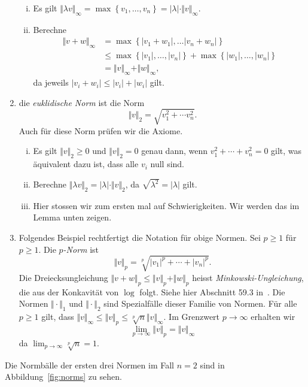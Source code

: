 \documentclass[../main.tex]{subfiles}
\begin{document}
\begin{examples}
\begin{enumerate}[(1)]
\begin{enumerate}[(i)]
        \item Es gilt $\Vert \lambda v \Vert_{\infty}
          = \max \left\{v_1, \dots, v_n\right\} = |\lambda|
          \cdot \Vert v \Vert_\infty$.
        \item Berechne
          \begin{align*}
            \Vert v + w \Vert_\infty
            &= \max \left\{|v_1 + w_1|, \dots |v_n + w_n|\right\} \\
            &\leq \max \left\{|v_{1}|, \dots, |v_{n}|\right\}
            + \max \left\{|w_{1}|, \dots, |w_{n}|\right\} \\
            &= \Vert v \Vert_{\infty} + \Vert w \Vert_{\infty},
          \end{align*}
          da jeweils $|v_i + w_i| \leq |v_i| + |w_i| $ gilt.
      \end{enumerate}
    \item die \emph{euklidische Norm} ist die Norm
      \[
        \Vert v \Vert_2 = \sqrt{v_1^2 + \cdots v_n^2}.
      \]
      Auch für diese Norm prüfen wir die Axiome.
      \begin{enumerate}[(i)]
        \item Es gilt $\Vert v \Vert_2 \geq 0$ und
          $\Vert v \Vert_2 = 0$ genau dann, wenn
          $v_1^2 + \cdots + v_n^2 = 0$ gilt,
          was äquivalent dazu ist, dass alle $v_i$ null sind.
        \item Berechne $\Vert \lambda v \Vert_2 = |\lambda | \cdot
          \Vert v \Vert_2$, da $\sqrt{\lambda^2} = |\lambda|$ gilt.
        \item Hier stossen wir zum ersten mal auf Schwierigkeiten.
          Wir werden das im Lemma unten zeigen.
      \end{enumerate}
    \item 
      Folgendes Beispiel rechtfertigt die Notation
      für obige Normen. Sei $p \geq 1$ für $p \geq 1$.
      Die \emph{$p$-Norm} ist
       \[
         \Vert v \Vert_p = \sqrt[p]{|v_1|^p + \cdots + |v_n|^p}.
      \]
      Die Dreiecksungleichung $\Vert v + w \Vert_p \leq
      \Vert v \Vert_p + \Vert w \Vert_p$ heisst
      \emph{Minkowski-Ungleichung}, die aus der
      Konkavität von $\log$ folgt. Siehe hier Abschnitt
      59.3 in~\cite{heuser}.
      Die Normen $\Vert \cdot \Vert_1$ und $\Vert \cdot \Vert_2$ 
      sind Spezialfälle dieser Familie von Normen.
      Für alle $p \geq 1$ gilt, dass $\Vert v \Vert_{\infty}
      \leq \Vert v \Vert_p \leq \sqrt[p]{n} \Vert v \Vert_{\infty}$.
      Im Grenzwert $p \to \infty$ erhalten wir
      \[
        \lim_{p \to \infty} \Vert v \Vert_p = \Vert v \Vert_{\infty}
      \]
      da $\lim_{p \to \infty} \sqrt[p]{n} = 1$.
  \end{enumerate}
  Die Normbälle der ersten drei Normen im Fall $n = 2$
  sind in Abbildung~\ref{fig:norms}
  zu sehen.
\end{examples}
\end{document}
